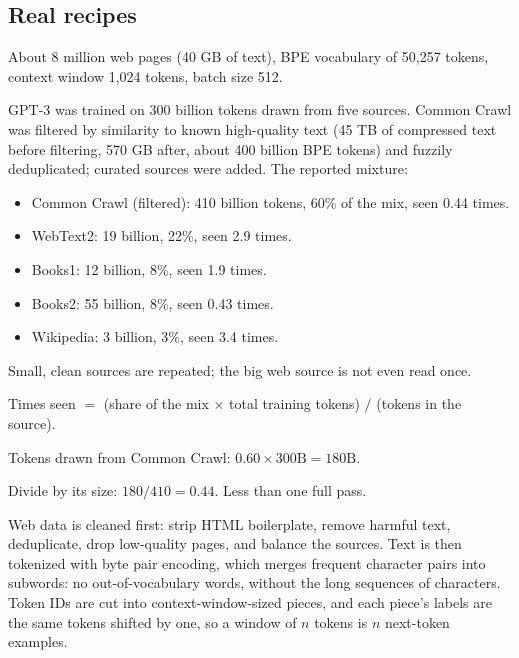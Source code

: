 \subsection*{Real recipes}

\begin{remark}
About 8 million web pages (40 GB of text), BPE vocabulary of 50,257 tokens, context window 1,024 tokens, batch size 512.
\end{remark}

\begin{remark}
GPT-3 was trained on 300 billion tokens drawn from five sources. Common Crawl was filtered by similarity to known high-quality text (45 TB of compressed text before filtering, 570 GB after, about 400 billion BPE tokens) and fuzzily deduplicated; curated sources were added. The reported mixture:
\begin{itemize}
  \item Common Crawl (filtered): 410 billion tokens, 60\% of the mix, seen 0.44 times.
  \item WebText2: 19 billion, 22\%, seen 2.9 times.
  \item Books1: 12 billion, 8\%, seen 1.9 times.
  \item Books2: 55 billion, 8\%, seen 0.43 times.
  \item Wikipedia: 3 billion, 3\%, seen 3.4 times.
\end{itemize}
Small, clean sources are repeated; the big web source is not even read once.
\end{remark}

\begin{example}
Times seen $=$ (share of the mix $\times$ total training tokens) $/$ (tokens in the source).
\begin{steps}
  \item Tokens drawn from Common Crawl: $0.60 \times 300\text{B} = 180\text{B}$.
  \item Divide by its size: $180/410 = 0.44$. Less than one full pass.
\end{steps}
\end{example}

\begin{sayit}
Web data is cleaned first: strip HTML boilerplate, remove harmful text, deduplicate, drop low-quality pages, and balance the sources. Text is then tokenized with byte pair encoding, which merges frequent character pairs into subwords: no out-of-vocabulary words, without the long sequences of characters. Token IDs are cut into context-window-sized pieces, and each piece's labels are the same tokens shifted by one, so a window of $n$ tokens is $n$ next-token examples.
\end{sayit}

